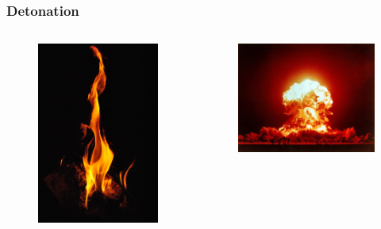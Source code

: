 \documentclass{beamer}
\begin{document}
\begin{frame}
\frametitle{Detonation}

\begin{columns}[c]
\begin{figure}
    \begin{center}
      \includegraphics[width=.70\linewidth]{fire.jpeg}
    \end{center}
  \end{figure}


        \begin{figure}
    \begin{center}
      \includegraphics[width=.90\linewidth]{nuke.jpg}
    \end{center}
  \end{figure}

        \end{columns}

\end{frame}
\end{document}
